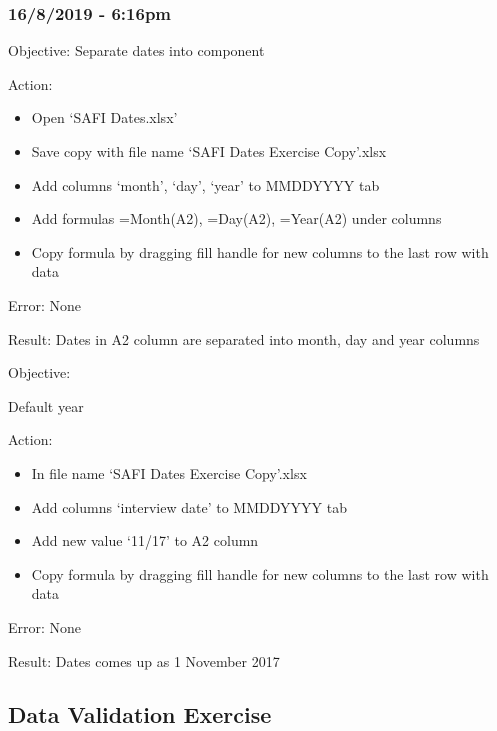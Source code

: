 \documentclass{article}
\begin{document}
\subsubsection*{16/8/2019 - 6:16pm}
Objective: Separate dates into component\par
Action:
\begin{itemize}
\item Open ‘SAFI Dates.xlsx’
\item Save copy with file name ‘SAFI Dates Exercise Copy’.xlsx
\item Add columns ‘month’, ‘day’, ‘year’  to MMDDYYYY tab
\item Add formulas =Month(A2), =Day(A2), =Year(A2) under columns
\item Copy formula by dragging fill handle for new columns to the last row with data
\end{itemize}
Error: None\par
Result: Dates in A2 column are separated into month, day and year columns\par
Objective:\par
Default year\par
Action:
\begin{itemize}
 \item In file name ‘SAFI Dates Exercise Copy’.xlsx
\item Add columns ‘interview date’  to MMDDYYYY tab
\item Add new value ‘11/17’ to A2 column
\item Copy formula by dragging fill handle for new columns to the last row with data
\end{itemize}
Error: None\par
Result: Dates comes up as 1 November 2017
\subsection{Data Validation Exercise}
\end{document}
